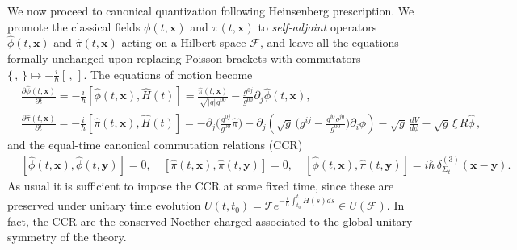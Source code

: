 \documentclass[../QFT_main.tex]{subfiles}
\begin{document}
\begin{mytheorem}
%
We now proceed to canonical quantization following Heinsenberg prescription.
We promote the classical fields $\phi(t,\mathbf{x})$ and $\pi(t,\mathbf{x})$ to \emph{self-adjoint} operators $\hat{\phi}(t,\mathbf{x})$ and $\hat{\pi}(t,\mathbf{x})$ acting on a Hilbert space $\mathcal{F}$, and leave all the equations formally unchanged upon replacing Poisson brackets with commutators $\{\,,\,\}\mapsto -\frac{i}{\hbar}[\,,\,]$.
The equations of motion become
{\small
\begin{align}\label{eq:EoM_quantized_curved_spacetim_klein_gordon}
    &\frac{\partial \hat{\phi}(t,\mathbf{x})}{\partial t} = -\frac{i}{\hbar} [\hat{\phi}(t,\mathbf{x}), \hat{H}(t)] = \frac{\hat{\pi}(t,\mathbf{x})}{\sqrt{|g|} g^{00}} - \frac{g^{0j}}{g^{00}} \partial_j \hat{\phi}(t,\mathbf{x}), \\[3pt]
    &\frac{\partial \hat{\pi}(t,\mathbf{x})}{\partial t} = -\frac{i}{\hbar} [\hat{\pi}(t,\mathbf{x}), \hat{H}(t)] = -\partial_j \Big(\tfrac{g^{0j}}{g^{00}}\hat{\pi}\Big) - \partial_j \left( \sqrt{g}\,\big(g^{ij}-\tfrac{g^{i0}g^{j0}}{g^{00}}\big)\partial_i \hat{\phi}\right) - \sqrt{g}\, \frac{dV}{d\phi} - \sqrt{g}\,\xi\,  R \hat{\phi}\,,
\end{align}}
and the equal-time canonical commutation relations (CCR) 
\begin{align}\label{eq:CCR_fields_curved_spacetime}
    &[\hat{\phi}(t,\mathbf{x}), \hat{\phi}(t,\mathbf{y})] = 0, \quad [\hat{\pi}(t,\mathbf{x}), \hat{\pi}(t,\mathbf{y})] = 0, \quad [\hat{\phi}(t,\mathbf{x}), \hat{\pi}(t,\mathbf{y})] = i\hbar\, \delta^{(3)}_{\Sigma_t}(\mathbf{x}-\mathbf{y}). 
\end{align}
As usual it is sufficient to impose the CCR at some fixed time, since these are preserved under unitary time evolution $U(t,t_0) = \mathcal{T} e^{-\frac{i}{\hbar}\int_{t_0}^t H(s) ds}\in U(\mathcal{F})$.
In fact, the CCR are the conserved Noether charged associated to the global unitary symmetry of the theory.


\end{mytheorem}
\end{document}
